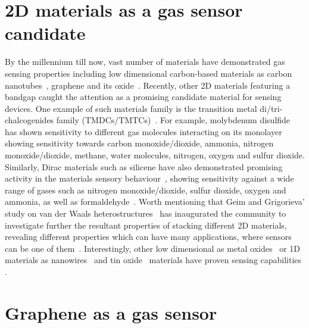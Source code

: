 \section{2D materials as a gas sensor candidate}
By the millennium till now, vast number of materials have demonstrated gas sensing properties including low dimensional carbon-based materials as carbon nanotubes~\cite{Kong2000, Kuang2007}, graphene and its oxide~\cite{Ong2001, Schedin2007, Morozov2008,Fowler2009, Massera2011, Gautam2012, He2012, Dan2009, Ghosh2009, Ratinac2010, Sun2010, Yao2012, Basu2012, Liu2012, Gallouze2013, Nemade2013a, Borini2013, Yuan2013, Llobet2013, Saini2014, Zhang2013, Zhou2014, Hwang2014, Nakamura2015, Smith2015, Smith2016a, Smith2017, Xuge2017, Melios2017, Wu2015}. Recently, other 2D materials featuring a bandgap caught the attention as a promising candidate material for sensing devices. One example of such materials family is the transition metal di/tri-chalcogenides family (TMDCs/TMTCs)~\cite{Zhao2014}. For example, molybdenum disulfide has shown sensitivity to different gas molecules interacting on its monolayer~\cite{Yue2013, Zhao2014} showing sensitivity towards carbon monoxide/dioxide, ammonia, nitrogen monoxide/dioxide, methane, water molecules, nitrogen, oxygen and sulfur dioxide. Similarly, Dirac materials such as silicene have also demonstrated promising activity in the materials sensory behaviour~\cite{Feng2014}, showing sensitivity against a wide range of gases such as nitrogen monoxide/dioxide, sulfur dioxide, oxygen and ammonia, as well as formaldehyde~\cite{Wang2015}. Worth mentioning that Geim and Grigorieva' study on van der Waals heterostructures~\cite{Geim2013} has inaugurated the community to investigate further the resultant properties of stacking different 2D materials, revealing different properties which can have many applications, where sensors can be one of them~\cite{Mayor2016}. Interestingly, other low dimensional as metal oxides~\cite{Korotcenkov2007} or 1D materials as nanowires~\cite{Kong2000, Zhou2003, Wang2003} and tin oxide~\cite{Kuang2007} materials have proven sensing capabilities .
\section{Graphene as a gas sensor}

